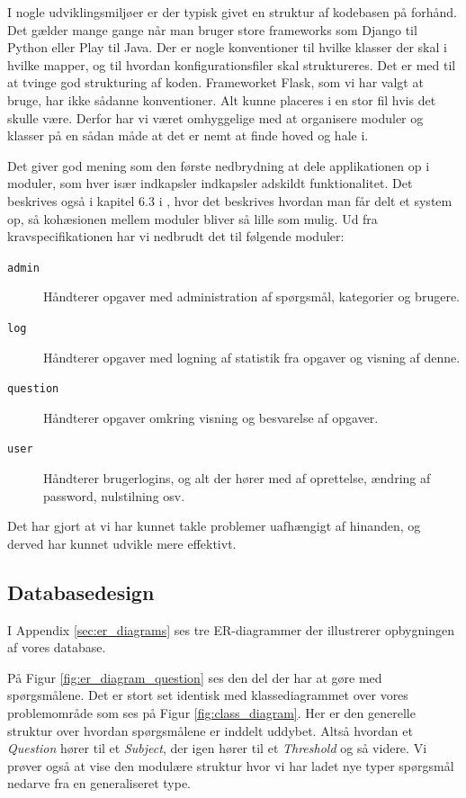\documentclass[11pt, a4paper]{article}
\begin{document}
I nogle udviklingsmiljøer er der typisk givet en struktur af kodebasen på forhånd. Det gælder mange gange når man bruger store frameworks som Django til Python eller Play til Java. Der er nogle konventioner til hvilke klasser der skal i hvilke mapper, og til hvordan konfigurationsfiler skal struktureres. Det er med til at tvinge god strukturing af koden. Frameworket Flask, som vi har valgt at bruge, har ikke sådanne konventioner. Alt kunne placeres i en stor fil hvis det skulle være. Derfor har vi været omhyggelige med at organisere moduler og klasser på en sådan måde at det er nemt at finde hoved og hale i.

Det giver god mening som den første nedbrydning at dele applikationen op i moduler, som hver især indkapsler indkapsler adskildt funktionalitet. Det beskrives også i kapitel 6.3 i \cite{OOSE}, hvor det beskrives hvordan man får delt et system op, så kohæsionen mellem moduler bliver så lille som mulig. Ud fra kravspecifikationen har vi nedbrudt det til følgende moduler:
\begin{description}
    \item[\texttt{admin}] Håndterer opgaver med administration af spørgsmål, kategorier og brugere.
    \item[\texttt{log}] Håndterer opgaver med logning af statistik fra opgaver og visning af denne.
    \item[\texttt{question}] Håndterer opgaver omkring visning og besvarelse af opgaver.
    \item[\texttt{user}] Håndterer brugerlogins, og alt der hører med af oprettelse, ændring af password, nulstilning osv.
\end{description}

Det har gjort at vi har kunnet takle problemer uafhængigt af hinanden, og derved har kunnet udvikle mere effektivt.

\subsection{Databasedesign}
\label{sub:databasedesign}
I Appendix \ref{sec:er_diagrams} ses tre ER-diagrammer der illustrerer opbygningen af vores database.

På Figur \ref{fig:er_diagram_question} ses den del der har at gøre med spørgsmålene. Det er stort set identisk med klassediagrammet over vores problemområde som ses på Figur \ref{fig:class_diagram}. Her er den generelle struktur over hvordan spørgsmålene er inddelt uddybet. Altså hvordan et \emph{Question} hører til et \emph{Subject}, der igen hører til et \emph{Threshold} og så videre. Vi prøver også at vise den modulære struktur hvor vi har ladet nye typer spørgsmål nedarve fra en generaliseret type.
\end{document}
